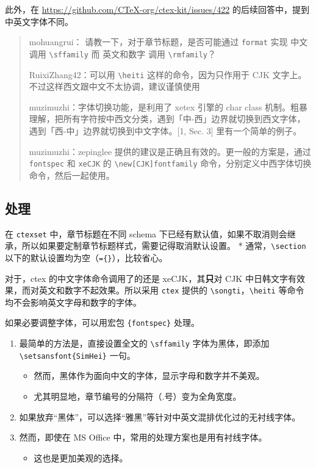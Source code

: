 \documentclass[../Main/thesis.tex]{subfiles}
\begin{document}
此外，在 \url{https://github.com/CTeX-org/ctex-kit/issues/422}
的后续回答中，提到中英文字体不同。

\begin{quote}
mohuangrui： 请教一下，对于章节标题，是否可能通过 \texttt{format} 实现
中文 调用 \texttt{\textbackslash{}sffamily} 而 英文和数字 调用
\texttt{\textbackslash{}rmfamily}？

RuixiZhang42：可以用 \texttt{\textbackslash{}heiti}
这样的命令，因为只作用于 CJK
文字上。不过这样西文跟中文不太协调，建议谨慎使用

muzimuzhi：字体切换功能，是利用了 xetex 引擎的 char class
机制。粗暴理解，把所有字符按中西文分类，遇到「中-西」边界就切换到西文字体，遇到「西-中」边界就切换到中文字体。{[}1,
Sec. 3{]} 里有一个简单的例子。

muzimuzhi：zepinglee 提供的建议是正确且有效的。更一般的方案是，通过
\texttt{fontspec} 和 \texttt{xeCJK} 的
\texttt{\textbackslash{}new{[}CJK{]}fontfamily}
命令，分别定义中西字体切换命令，然后一起使用。
\end{quote}


\subsection{处理}

在 \texttt{ctexset} 中，章节标题在不同 schema
下已经有默认值，如果不取消则会继承，所以如果要定制章节标题样式，需要记得取消默认设置。
* 通常，\texttt{\textbackslash{}section}
以下的默认设置均为空（\texttt{=\{\}}），比较省心。

对于，ctex 的中文字体命令调用了的还是 xeCJK，其\textbf{只}对 CJK
中日韩文字有效果，而对英文和数字不起效果。所以采用 \texttt{ctex} 提供的
\texttt{\textbackslash{}songti}，\texttt{\textbackslash{}heiti}
等命令均不会影响英文字母和数字的字体。

如果必要调整字体，可以用宏包 \texttt{\{fontspec\}} 处理。

\begin{enumerate}
\def\labelenumi{\arabic{enumi}.}
\item
  最简单的方法是，直接设置全文的 \texttt{\textbackslash{}sffamily}
  字体为黑体，即添加 \texttt{\textbackslash{}setsansfont\{SimHei\}}
  一句。

  \begin{itemize}
  \item
    然而，黑体作为面向中文的字体，显示字母和数字并不美观。
  \item
    尤其明显地，章节编号的分隔符（.号）变为全角宽度。
  \end{itemize}
\item
  如果放弃``黑体''，可以选择``雅黑''等针对中英文混排优化过的无衬线字体。
\item
  然而，即使在 MS Office 中，常用的处理方案也是用有衬线字体。

  \begin{itemize}
  \item
    这也是更加美观的选择。
  \end{itemize}
\end{enumerate}
\end{document}
